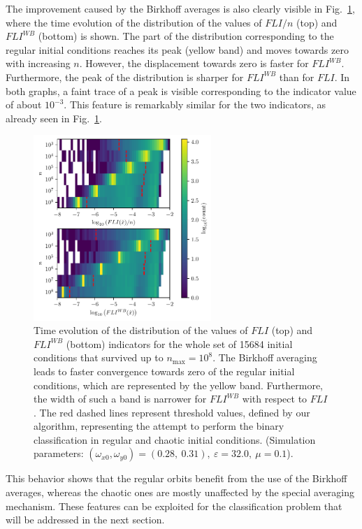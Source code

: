 The improvement caused by the Birkhoff averages is also clearly visible in Fig.~\ref{fig:fli_colormap_mean_birk}, where the time evolution of the distribution of the values of $FLI/n$ (top) and $FLI^{WB}$ (bottom) is shown. The part of the distribution corresponding to the regular initial conditions reaches its peak (yellow band) and moves towards zero with increasing $n$. However, the displacement towards zero is faster for $FLI^{WB}$. Furthermore, the peak of the distribution is sharper for $FLI^{WB}$ than for $FLI$. In both graphs, a faint trace of a peak is visible corresponding to the indicator value of about $10^{-3}$. This feature is remarkably similar for the two indicators, as already seen in Fig.~\ref{fig:fli_colormap_mean_birk}.

\begin{figure}[htp]
    \centering
    \includegraphics[width=0.6\textwidth]{6_dynamic_indicators/fig/lyapunov_birkhoff_map.pdf}
    \caption{Time evolution of the distribution of the values of $FLI$ (top) and $FLI^{WB}$ (bottom) indicators for the whole set of 15684 initial conditions that survived up to $n_\text{max}=10^8$. The Birkhoff averaging leads to faster convergence towards zero of the regular initial conditions, which are represented by the yellow band. Furthermore, the width of such a band is narrower for $FLI^{WB}$ with respect to $FLI$. The red dashed lines represent threshold values, defined by our algorithm, representing the attempt to perform the binary classification in regular and chaotic initial conditions. (Simulation parameters: $(\omega_{x0},\omega_{y0})= (0.28,\ 0.31),\ \varepsilon=32.0,\  \mu=0.1$).}
    \label{fig:fli_colormap_mean_birk}
\end{figure}

This behavior shows that the regular orbits benefit from the use of the Birkhoff averages, whereas the chaotic ones are mostly unaffected by the special averaging mechanism. These features can be exploited for the classification problem that will be addressed in the next section.

